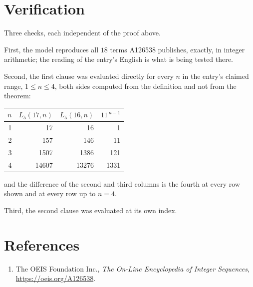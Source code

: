 \documentclass[11pt,a4paper]{article}
\theoremstyle{plain}
\theoremstyle{definition}
\begin{document}
\section{Verification}

Three checks, each independent of the proof above.

First, the model reproduces all $18$ terms A126538 publishes, exactly, in integer
arithmetic; the reading of the entry's English is what is being tested there.

Second, the first clause was evaluated directly for every $n$ in the entry's claimed range,
$1\le n\le4$, both sides computed from the definition and not from the theorem:

\begin{center}
\begin{tabular}{rrrr}
$n$ & $L_{5}(17,n)$ & $L_{5}(16,n)$ & $11^{\,n-1}$ \\ \hline
1 & 17 & 16 & 1 \\
2 & 157 & 146 & 11 \\
3 & 1507 & 1386 & 121 \\
4 & 14607 & 13276 & 1331 \\
\end{tabular}
\end{center}

\noindent and the difference of the second and third columns is the fourth at every row shown
and at every row up to $n=4$.

Third, the second clause was evaluated at its own index.

\section*{References}
\begin{enumerate}
\item The OEIS Foundation Inc., \emph{The On-Line Encyclopedia of Integer Sequences},
\url{https://oeis.org/A126538}.
\end{enumerate}
\end{document}
